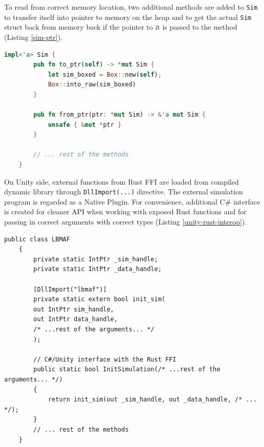 To read from correct memory location, two additional methods are added to \texttt{Sim} to transfer itself into pointer to memory on the heap and to get the actual \texttt{Sim} struct back from memory back if the pointer to it is passed to the method (Listing \ref{sim-ptr}).

\begin{lstlisting}[language=Rust, caption=Storing and restoring \texttt{Sim} struct with pointers., label=sim-ptr]
	impl<'a> Sim {
		pub fn to_ptr(self) -> *mut Sim {
			let sim_boxed = Box::new(self);
			Box::into_raw(sim_boxed)
		}
		
		pub fn from_ptr(ptr: *mut Sim) -> &'a mut Sim {
			unsafe { &mut *ptr }
		}
		
		// ... rest of the methods
	}
\end{lstlisting}


On Unity side, external functions from Rust FFI are loaded from compiled dynamic library through \texttt{DllImport(...)} directive. The external simulation program is regarded as a Native Plugin. For convenience, additional C\# interface is created for cleaner API when working with exposed Rust functions and for passing in correct arguments with correct types (Listing \ref{unity-rust-interop}).

\begin{lstlisting}[language=Csharp, caption=Creating a C\# interface for the Rust functions from simulation plugin and storing the pointers to Rust \texttt{Sim} struct and results data., label=unity-rust-interop]
	public class LBMAF
	{
		private static IntPtr _sim_handle;
		private static IntPtr _data_handle;
		
		[DllImport("lbmaf")]
		private static extern bool init_sim(
		out IntPtr sim_handle,
		out IntPtr data_handle,
		/* ...rest of the arguments... */
		);
		
		// C#/Unity interface with the Rust FFI
		public static bool InitSimulation(/* ...rest of the arguments... */)
		{
			return init_sim(out _sim_handle, out _data_handle, /* ... */);
		}
		// ... rest of the methods
	}
\end{lstlisting}

